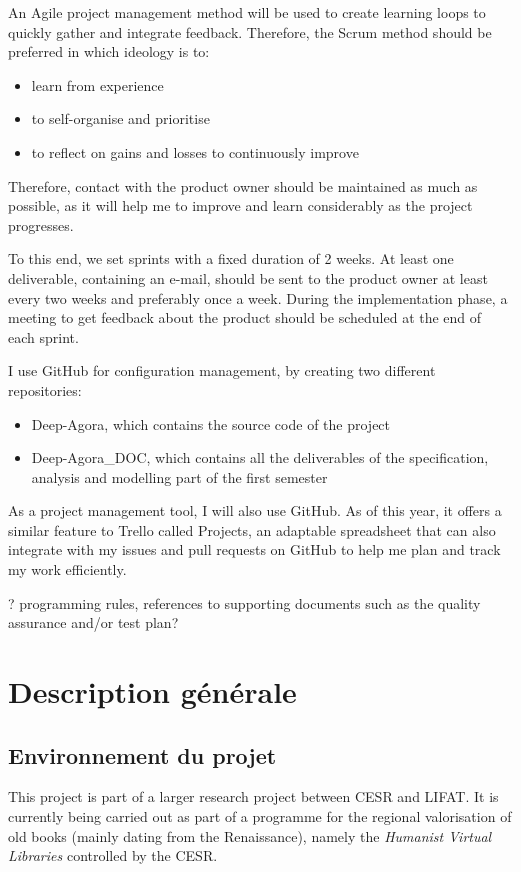 \documentclass{polytech/polytech}
\numberwithin{figure}{chapter}
\begin{document}
An Agile project management method will be used to create learning loops to quickly gather and integrate feedback. Therefore, the Scrum method should be preferred in which ideology is to:
\begin{itemize}
\item learn from experience
\item to self-organise and prioritise
\item to reflect on gains and losses to continuously improve
\end{itemize}

Therefore, contact with the product owner should be maintained as much as possible, as it will help me to improve and learn considerably as the project progresses.

To this end, we set sprints with a fixed duration of 2 weeks.
At least one deliverable, containing an e-mail, should be sent to the product owner at least every two weeks and preferably once a week.
During the implementation phase, a meeting to get feedback about the product should be scheduled at the end of each sprint.

I use GitHub for configuration management, by creating two different repositories:
\begin{itemize}
\item Deep-Agora, which contains the source code of the project
\item Deep-Agora_DOC, which contains all the deliverables of the specification, analysis and modelling part of the first semester
\end{itemize}
As a project management tool, I will also use GitHub. As of this year, it offers a similar feature to Trello called Projects, an adaptable spreadsheet that can also integrate with my issues and pull requests on GitHub to help me plan and track my work efficiently.

? programming rules, references to supporting documents such as the quality assurance and/or test plan?

\chapter{Description générale}
\section{Environnement du projet}

This project is part of a larger research project between CESR and LIFAT. It is currently being carried out as part of a programme for the regional valorisation of old books (mainly dating from the Renaissance), namely the {\it Humanist Virtual Libraries} controlled by the CESR.
\end{document}
